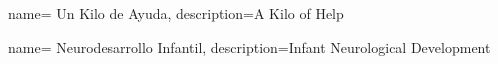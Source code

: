 {
  name= Un Kilo de Ayuda,
  description={A Kilo of Help}
}

{
  name= Neurodesarrollo Infantil,
  description={Infant Neurological Development}
}